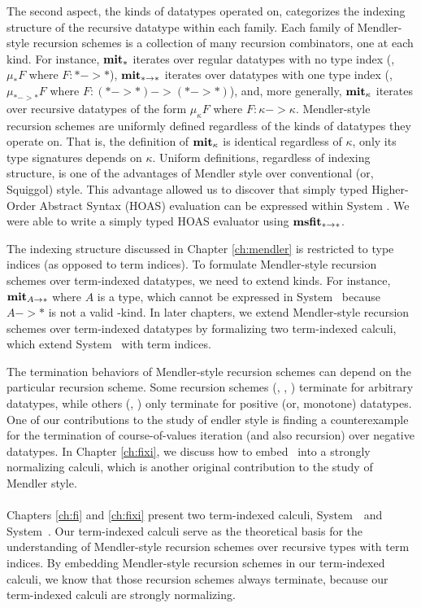 The second aspect, the kinds of datatypes operated on, categorizes
the indexing structure of the recursive datatype within each family.
Each family of Mendler-style recursion schemes is a collection of
many recursion combinators, one at each kind. For instance, $\mathbf{mit}_{*}$
iterates over regular datatypes with no type index (\ie, $\mu_{*}F$
where $F : * -> *$), $\mathbf{mit}_{* -> *}$ iterates over datatypes with
one type index (\ie, $\mu_{* -> *} F$ where $F : (* -> *) -> (* -> *)$),
and, more generally, $\mathbf{mit}_{\kappa}$ iterates over recursive datatypes of
the form $\mu_{\kappa}F$ where $F : \kappa -> \kappa$.
Mendler-style recursion schemes are uniformly defined regardless of the kinds
of datatypes they operate on. That is, the definition of $\mathbf{mit}_{\kappa}$ is
identical regardless of $\kappa$, only its type signatures depends on $\kappa$.
Uniform definitions, regardless of indexing structure, is one of the advantages
of Mendler style over conventional (or, Squiggol) style. This advantage allowed
us to discover that simply typed Higher-Order Abstract Syntax (HOAS) evaluation
can be expressed within System \Fw. We were able to write a simply typed HOAS
evaluator using $\mathbf{msfit}_{* -> *}$.

The indexing structure discussed in Chapter \ref{ch:mendler} is restricted to
type indices (as opposed to term indices). To formulate Mendler-style recursion
schemes over term-indexed datatypes, we need to extend kinds. For instance,
$\mathbf{mit}_{A -> *}$ where $A$ is a type, which cannot be expressed in System \Fw\ 
because $A -> *$ is not a valid \Fw-kind. In later chapters, we extend
Mendler-style recursion schemes over term-indexed datatypes by formalizing
two term-indexed calculi, which extend System \Fw\ with term indices.

The termination behaviors of Mendler-style recursion schemes can depend on
the particular recursion scheme. Some recursion schemes (\MIt, \MPr, \MsfIt)
terminate for arbitrary datatypes, while others (\McvPr, \McvIt) only terminate
for positive (or, monotone) datatypes. One of our contributions to the study of
endler style is finding a counterexample for the termination of
course-of-values iteration (and also recursion) over negative datatypes.
In Chapter \ref{ch:fixi}, we discuss how to embed \McvPr\ into
a strongly normalizing calculi, which is another original contribution to
the study of Mendler style.

\paragraph{}
Chapters \ref{ch:fi} and \ref{ch:fixi} present two term-indexed calculi,
System~\Fi\ and System~\Fixi. Our term-indexed calculi serve as
the theoretical basis for the understanding of Mendler-style recursion schemes
over recursive types with term indices. By embedding Mendler-style recursion
schemes in our term-indexed calculi, we know that those recursion schemes
always terminate, because our term-indexed calculi are strongly normalizing.

